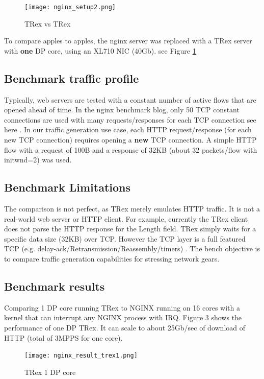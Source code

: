 \documentclass[conference]{IEEEtran}
\begin{document}
\begin{figure}[h]
  \texttt{[image: nginx\_setup2.png]}
  \caption{TRex vs TRex}
  \label{fig:trex_vs_trex}
\end{figure}

To compare apples to apples, the nginx server was replaced with a TRex server with \textbf{one} DP core, using an XL710 NIC (40Gb). 
see Figure \ref{fig:trex_vs_trex}

\subsection{Benchmark traffic profile}

Typically, web servers are tested with a constant number of active flows that are opened ahead of time. 
In the nginx benchmark blog, only 50 TCP constant connections are used with many requests/responses 
for each TCP connection see here \cite{b6}. In our traffic generation use case, each HTTP request/response (for each new TCP connection) requires opening a \textbf{new} TCP connection. 
A simple HTTP flow with a request of 100B and a response of 32KB (about 32 packets/flow with initwnd=2) was used.

\subsection{Benchmark Limitations}

The comparison is not perfect, as TRex merely emulates HTTP traffic. 
It is not a real-world web server or HTTP client. For example, currently the TRex client does not parse the HTTP response for the Length field. 
TRex simply waits for a specific data size (32KB) over TCP. However the TCP layer is a full featured TCP (e.g. delay-ack/Retransmission/Reassembly/timers) . 
The bench objective is to compare traffic generation capabilities for stressing network gears. 

\subsection{Benchmark results}

Comparing 1 DP core running TRex to NGINX running on 16 cores with a kernel that can interrupt any NGINX process with IRQ. Figure 3 shows the performance of one DP TRex. 
It can scale to about 25Gb/sec of download of HTTP (total of 3MPPS for one core).

\begin{figure}[h]
  \texttt{[image: nginx\_result\_trex1.png]}
  \caption{TRex 1 DP core}
  \label{fig:trex_nginx_r1}
\end{figure}
\end{document}
